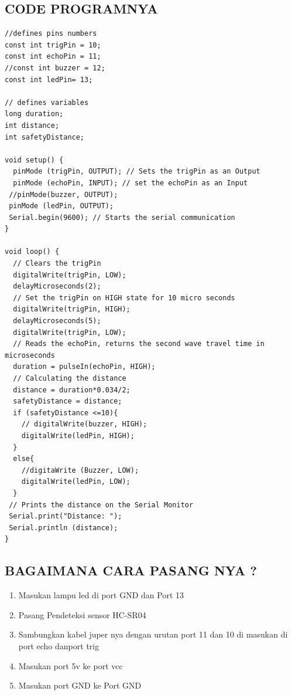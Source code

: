 \subsection{CODE PROGRAMNYA}
\begin{lstlisting}
//defines pins numbers
const int trigPin = 10;
const int echoPin = 11;
//const int buzzer = 12;
const int ledPin= 13;

// defines variables
long duration;
int distance;
int safetyDistance;

void setup() {
  pinMode (trigPin, OUTPUT); // Sets the trigPin as an Output
  pinMode (echoPin, INPUT); // set the echoPin as an Input
 //pinMode(buzzer, OUTPUT);
 pinMode (ledPin, OUTPUT);
 Serial.begin(9600); // Starts the serial communication
}

void loop() {
  // Clears the trigPin
  digitalWrite(trigPin, LOW);
  delayMicroseconds(2);
  // Set the trigPin on HIGH state for 10 micro seconds
  digitalWrite(trigPin, HIGH);
  delayMicroseconds(5);
  digitalWrite(trigPin, LOW);
  // Reads the echoPin, returns the second wave travel time in microseconds
  duration = pulseIn(echoPin, HIGH);
  // Calculating the distance
  distance = duration*0.034/2;
  safetyDistance = distance;
  if (safetyDistance <=10){
    // digitalWrite(buzzer, HIGH);
    digitalWrite(ledPin, HIGH);
  }
  else{
    //digitaWrite (Buzzer, LOW);
    digitalWrite(ledPin, LOW);
  }
 // Prints the distance on the Serial Monitor
 Serial.print("Distance: ");
 Serial.println (distance);
}
\end{lstlisting}

\subsection{BAGAIMANA CARA PASANG NYA ?}
\begin{enumerate}
\item Masukan lampu led di port GND dan Port 13
\item Pasang Pendeteksi sensor HC-SR04
\item Sambungkan kabel juper nya dengan urutan port 11 dan 10 di masukan di port echo danport trig
\item Masukan port 5v ke port vcc
\item Masukan port GND ke Port GND
\end{enumerate}

